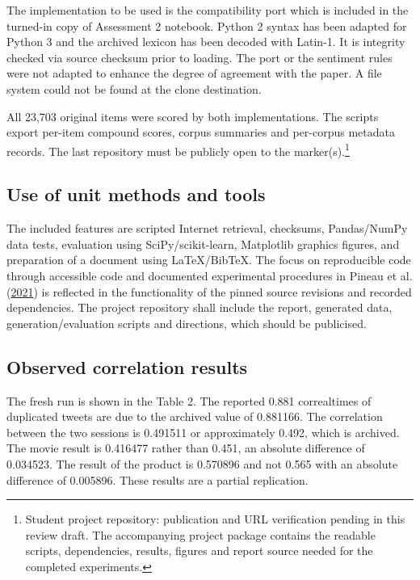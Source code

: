 \documentclass[11pt]{article}
\begin{document}
The implementation to be used is the compatibility port which is included in the turned-in copy of Assessment 2 notebook. Python 2 syntax has been adapted for Python 3 and the archived lexicon has been decoded with Latin-1. It is integrity checked via source checksum prior to loading. The port or the sentiment rules were not adapted to enhance the degree of agreement with the paper. A file system could not be found at the clone destination.


All 23,703 original items were scored by both implementations. The scripts export per-item compound scores, corpus summaries and per-corpus metadata records. The last repository must be publicly open to the marker(s).\footnote{Student project repository: publication and URL verification pending in this review draft. The accompanying project package contains the readable scripts, dependencies, results, figures and report source needed for the completed experiments.}


\subsection{Use of unit methods and tools}

The included features are scripted Internet retrieval, checksums, Pandas/NumPy data tests, evaluation using SciPy/scikit-learn, Matplotlib graphics figures, and preparation of a document using LaTeX/BibTeX. The focus on reproducible code through accessible code and documented experimental procedures in Pineau et al. (\hyperlink{ref_pineau2021reproducibility}{2021}) is reflected in the functionality of the pinned source revisions and recorded dependencies. The project repository shall include the report, generated data, generation/evaluation scripts and directions, which should be publicised.


\subsection{Observed correlation results}

The fresh run is shown in the Table 2. The reported 0.881 correaltimes of duplicated tweets are due to the archived value of 0.881166. The correlation between the two sessions is 0.491511 or approximately 0.492, which is archived. The movie result is 0.416477 rather than 0.451, an absolute difference of 0.034523. The result of the product is 0.570896 and not 0.565 with an absolute difference of 0.005896. These results are a partial replication.
\end{document}
